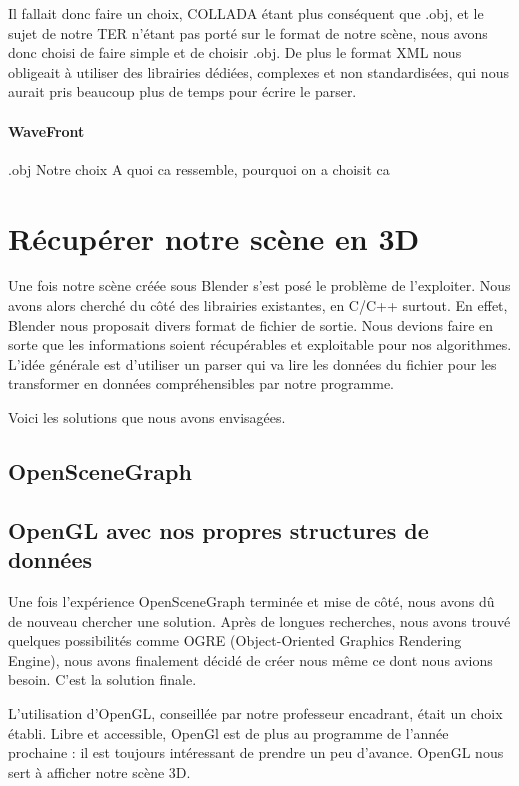 \documentclass[a4paper,12pt]{report}
\begin{document}
Il fallait donc faire un choix, COLLADA étant plus conséquent que .obj, et le sujet de notre TER n'étant pas porté sur le format de notre scène, 
nous avons donc choisi de faire simple et de choisir .obj. De plus le format XML nous obligeait à utiliser des librairies dédiées, complexes et non standardisées, qui nous aurait pris beaucoup plus de temps pour écrire le parser.

\paragraph{WaveFront}

.obj
Notre choix
A quoi ca ressemble, pourquoi on a choisit ca

\section{Récupérer notre scène en 3D}
 
Une fois notre scène créée sous Blender s'est posé le problème de l'exploiter. Nous avons alors cherché du côté des librairies existantes, en C/C++ surtout. En effet, Blender nous proposait divers format de fichier de sortie. Nous devions faire en sorte que les informations soient récupérables et exploitable pour nos algorithmes. L'idée générale est d'utiliser un parser qui va lire les données du fichier pour les transformer en données compréhensibles par notre programme.

Voici les solutions que nous avons envisagées.
 
\subsection{OpenSceneGraph}

\subsection{OpenGL avec nos propres structures de données}

Une fois l'expérience OpenSceneGraph terminée et mise de côté, nous avons dû de nouveau chercher une solution. Après de longues recherches, nous avons trouvé quelques possibilités comme OGRE (Object-Oriented Graphics Rendering Engine), nous avons finalement décidé de créer nous même ce dont nous avions besoin. C'est la solution finale.

L'utilisation d'OpenGL, conseillée par notre professeur encadrant, était un choix établi. Libre et accessible, OpenGl est de plus au programme de l'année prochaine : il est toujours intéressant de prendre un peu d'avance. OpenGL nous sert à afficher notre scène 3D.
\end{document}
